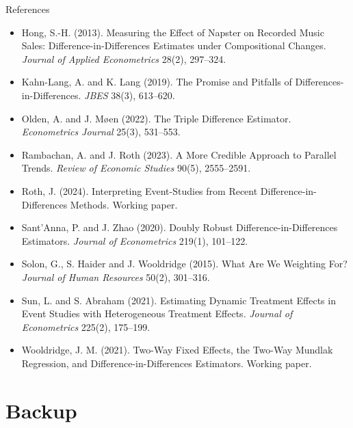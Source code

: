 \documentclass[
  11pt,
  ignorenonframetext,
  aspectratio=169,
]{beamer}
\begin{document}
\begin{frame}{References}
\begin{itemize}
  Econometric Evaluation Estimator. \emph{Review of Economic Studies}
  64(4), 605--654.
\item
  Hong, S.-H. (2013). Measuring the Effect of Napster on Recorded Music
  Sales: Difference-in-Differences Estimates under Compositional
  Changes. \emph{Journal of Applied Econometrics} 28(2), 297--324.
\item
  Kahn-Lang, A. and K. Lang (2019). The Promise and Pitfalls of
  Differences-in-Differences. \emph{JBES} 38(3), 613--620.
\item
  Olden, A. and J. Møen (2022). The Triple Difference Estimator.
  \emph{Econometrics Journal} 25(3), 531--553.
\item
  Rambachan, A. and J. Roth (2023). A More Credible Approach to Parallel
  Trends. \emph{Review of Economic Studies} 90(5), 2555--2591.
\item
  Roth, J. (2024). Interpreting Event-Studies from Recent
  Difference-in-Differences Methods. Working paper.
\item
  Sant'Anna, P. and J. Zhao (2020). Doubly Robust
  Difference-in-Differences Estimators. \emph{Journal of Econometrics}
  219(1), 101--122.
\item
  Solon, G., S. Haider and J. Wooldridge (2015). What Are We Weighting
  For? \emph{Journal of Human Resources} 50(2), 301--316.
\item
  Sun, L. and S. Abraham (2021). Estimating Dynamic Treatment Effects in
  Event Studies with Heterogeneous Treatment Effects. \emph{Journal of
  Econometrics} 225(2), 175--199.
\item
  Wooldridge, J. M. (2021). Two-Way Fixed Effects, the Two-Way Mundlak
  Regression, and Difference-in-Differences Estimators. Working paper.
\end{itemize}
\end{frame}

\section{Backup}\label{backup}
\end{document}
